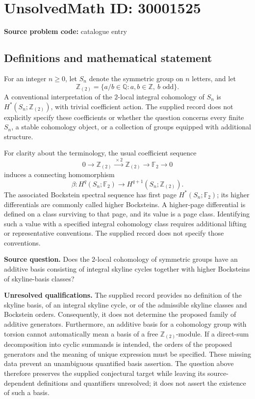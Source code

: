 \documentclass[11pt]{article}
\newcommand{\Z}{\mathbb{Z}}
\newcommand{\Q}{\mathbb{Q}}
\newcommand{\F}{\mathbb{F}}
\begin{document}
\section*{UnsolvedMath ID: 30001525}
\textbf{Source problem code:} catalogue entry
\subsection{Definitions and mathematical statement}
For an integer \(n\geq 0\), let \(S_n\) denote the symmetric group on \(n\) letters, and let
\[
\Z_{(2)}=\{a/b\in\Q: a,b\in\Z,\ b\text{ odd}\}.
\]
A conventional interpretation of the \(2\)-local integral cohomology of \(S_n\) is \(H^*(S_n;\Z_{(2)})\), with trivial coefficient action. The supplied record does not explicitly specify these coefficients or whether the question concerns every finite \(S_n\), a stable cohomology object, or a collection of groups equipped with additional structure.

For clarity about the terminology, the usual coefficient sequence
\[
0\longrightarrow\Z_{(2)}\xrightarrow{\,\times 2\,}\Z_{(2)}\longrightarrow\F_2\longrightarrow 0
\]
induces a connecting homomorphism
\[
\beta:H^q(S_n;\F_2)\longrightarrow H^{q+1}(S_n;\Z_{(2)}).
\]
The associated Bockstein spectral sequence has first page \(H^*(S_n;\F_2)\); its higher differentials are commonly called higher Bocksteins. A higher-page differential is defined on a class surviving to that page, and its value is a page class. Identifying such a value with a specified integral cohomology class requires additional lifting or representative conventions. The supplied record does not specify those conventions.

\textbf{Source question.} Does the \(2\)-local cohomology of symmetric groups have an additive basis consisting of integral skyline cycles together with higher Bocksteins of skyline-basis classes?

\textbf{Unresolved qualifications.} The supplied record provides no definition of the skyline basis, of an integral skyline cycle, or of the admissible skyline classes and Bockstein orders. Consequently, it does not determine the proposed family of additive generators. Furthermore, an additive basis for a cohomology group with torsion cannot automatically mean a basis of a free \(\Z_{(2)}\)-module. If a direct-sum decomposition into cyclic summands is intended, the orders of the proposed generators and the meaning of unique expression must be specified. These missing data prevent an unambiguous quantified basis assertion. The question above therefore preserves the supplied conjectural target while leaving its source-dependent definitions and quantifiers unresolved; it does not assert the existence of such a basis.
\end{document}
